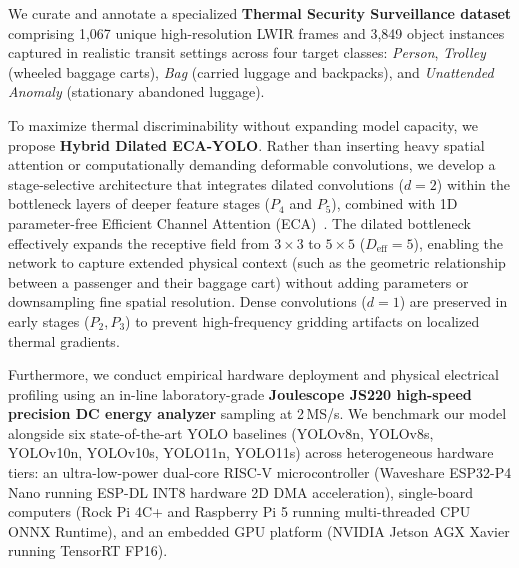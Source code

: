 \documentclass[journal,twoside,web]{ieeecolor}
\begin{document}
We curate and annotate a specialized \textbf{Thermal Security Surveillance dataset} comprising 1,067 unique high-resolution LWIR frames and 3,849 object instances captured in realistic transit settings across four target classes: \textit{Person}, \textit{Trolley} (wheeled baggage carts), \textit{Bag} (carried luggage and backpacks), and \textit{Unattended Anomaly} (stationary abandoned luggage).

To maximize thermal discriminability without expanding model capacity, we propose \textbf{Hybrid Dilated ECA-YOLO}. Rather than inserting heavy spatial attention or computationally demanding deformable convolutions, we develop a stage-selective architecture that integrates dilated convolutions ($d=2$) within the bottleneck layers of deeper feature stages ($P_4$ and $P_5$), combined with 1D parameter-free Efficient Channel Attention (ECA)~\cite{wang2020eca}. The dilated bottleneck effectively expands the receptive field from $3\times3$ to $5\times5$ ($D_{\text{eff}}=5$), enabling the network to capture extended physical context (such as the geometric relationship between a passenger and their baggage cart) without adding parameters or downsampling fine spatial resolution. Dense convolutions ($d=1$) are preserved in early stages ($P_2, P_3$) to prevent high-frequency gridding artifacts on localized thermal gradients.

Furthermore, we conduct empirical hardware deployment and physical electrical profiling using an in-line laboratory-grade \textbf{Joulescope JS220 high-speed precision DC energy analyzer} sampling at 2\,MS/s. We benchmark our model alongside six state-of-the-art YOLO baselines (YOLOv8n, YOLOv8s, YOLOv10n, YOLOv10s, YOLO11n, YOLO11s) across heterogeneous hardware tiers: an ultra-low-power dual-core RISC-V microcontroller (Waveshare ESP32-P4 Nano running ESP-DL INT8 hardware 2D DMA acceleration), single-board computers (Rock Pi 4C+ and Raspberry Pi 5 running multi-threaded CPU ONNX Runtime), and an embedded GPU platform (NVIDIA Jetson AGX Xavier running TensorRT FP16).
\end{document}
